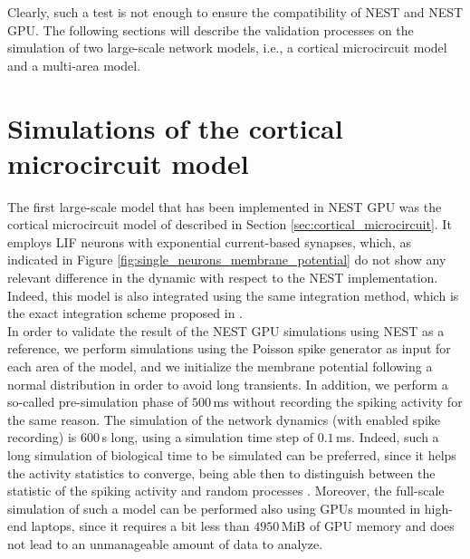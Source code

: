\documentclass[a4paper, 12pt, twoside, openright]{book}
\begin{document}
Clearly, such a test is not enough to ensure the compatibility of NEST and NEST GPU. The following sections will describe the validation processes on the simulation of two large-scale network models, i.e., a cortical microcircuit model and a multi-area model.


\section{Simulations of the cortical microcircuit model}
\label{sec:cm_validation}
The first large-scale model that has been implemented in NEST GPU was the cortical microcircuit model of \cite{Potjans2012} described in Section \ref{sec:cortical_microcircuit}. It employs LIF neurons with exponential current-based synapses, which, as indicated in Figure \ref{fig:single_neurons_membrane_potential} do not show any relevant difference in the dynamic with respect to the NEST implementation. Indeed, this model is also integrated using the same integration method, which is the exact integration scheme proposed in \cite{Rotter1999}.\\
In order to validate the result of the NEST GPU simulations using NEST as a reference, we perform simulations using the Poisson spike generator as input for each area of the model, and we initialize the membrane potential following a normal distribution in order to avoid long transients. In addition, we perform a so-called pre-simulation phase of $500$\,ms without recording the spiking activity for the same reason. The simulation of the network dynamics (with enabled spike recording) is $600$\,s long, using a simulation time step of $0.1$\,ms. Indeed, such a long simulation of biological time to be simulated can be preferred, since it helps the activity statistics to converge, being able then to distinguish between the statistic of the spiking activity and random processes \cite{Dasbach2021}. Moreover, the full-scale simulation of such a model can be performed also using GPUs mounted in high-end laptops, since it requires a bit less than $4950$\,MiB of GPU memory and does not lead to an unmanageable amount of data to analyze.\\
\end{document}
